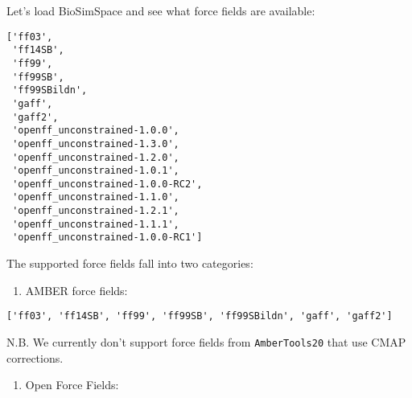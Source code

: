 Let's load BioSimSpace and see what force fields are available:

\begin{Shaded}
\begin{Highlighting}[]

\end{Highlighting}
\end{Shaded}

\begin{verbatim}
['ff03',
 'ff14SB',
 'ff99',
 'ff99SB',
 'ff99SBildn',
 'gaff',
 'gaff2',
 'openff_unconstrained-1.0.0',
 'openff_unconstrained-1.3.0',
 'openff_unconstrained-1.2.0',
 'openff_unconstrained-1.0.1',
 'openff_unconstrained-1.0.0-RC2',
 'openff_unconstrained-1.1.0',
 'openff_unconstrained-1.2.1',
 'openff_unconstrained-1.1.1',
 'openff_unconstrained-1.0.0-RC1']
\end{verbatim}

The supported force fields fall into two categories:

\begin{enumerate}
\def\labelenumi{\arabic{enumi})}
\tightlist
\item
  AMBER force fields:
\end{enumerate}

\begin{Shaded}
\begin{Highlighting}[]
\end{Highlighting}
\end{Shaded}

\begin{verbatim}
['ff03', 'ff14SB', 'ff99', 'ff99SB', 'ff99SBildn', 'gaff', 'gaff2']
\end{verbatim}

N.B. We currently don't support force fields from \texttt{AmberTools20}
that use CMAP corrections.

\begin{enumerate}
\def\labelenumi{\arabic{enumi})}
\setcounter{enumi}{1}
\tightlist
\item
  Open Force Fields:
\end{enumerate}

\begin{Shaded}
\begin{Highlighting}[]
\end{Highlighting}
\end{Shaded}

